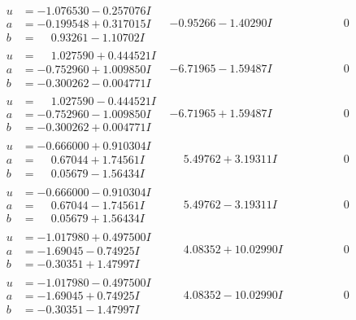 \documentclass[1p]{elsarticle_modified}
\theoremstyle{definition}
\begin{document}
$$\begin{array}{c|c|c}
\begin{aligned}
u &= -1.076530 - 0.257076 I \\
a &= -0.199548 + 0.317015 I \\
b &= \phantom{-}0.93261 - 1.10702 I\end{aligned}
 & -0.95266 - 1.40290 I & \phantom{-0.000000 } 0 \\ \hline\begin{aligned}
u &= \phantom{-}1.027590 + 0.444521 I \\
a &= -0.752960 + 1.009850 I \\
b &= -0.300262 - 0.004771 I\end{aligned}
 & -6.71965 - 1.59487 I & \phantom{-0.000000 } 0 \\ \hline\begin{aligned}
u &= \phantom{-}1.027590 - 0.444521 I \\
a &= -0.752960 - 1.009850 I \\
b &= -0.300262 + 0.004771 I\end{aligned}
 & -6.71965 + 1.59487 I & \phantom{-0.000000 } 0 \\ \hline\begin{aligned}
u &= -0.666000 + 0.910304 I \\
a &= \phantom{-}0.67044 + 1.74561 I \\
b &= \phantom{-}0.05679 - 1.56434 I\end{aligned}
 & \phantom{-}5.49762 + 3.19311 I & \phantom{-0.000000 } 0 \\ \hline\begin{aligned}
u &= -0.666000 - 0.910304 I \\
a &= \phantom{-}0.67044 - 1.74561 I \\
b &= \phantom{-}0.05679 + 1.56434 I\end{aligned}
 & \phantom{-}5.49762 - 3.19311 I & \phantom{-0.000000 } 0 \\ \hline\begin{aligned}
u &= -1.017980 + 0.497500 I \\
a &= -1.69045 - 0.74925 I \\
b &= -0.30351 + 1.47997 I\end{aligned}
 & \phantom{-}4.08352 + 10.02990 I & \phantom{-0.000000 } 0 \\ \hline\begin{aligned}
u &= -1.017980 - 0.497500 I \\
a &= -1.69045 + 0.74925 I \\
b &= -0.30351 - 1.47997 I\end{aligned}
 & \phantom{-}4.08352 - 10.02990 I & \phantom{-0.000000 } 0 \\ \hline\begin{aligned}

\end{aligned}
\end{array}$$
\end{document}
